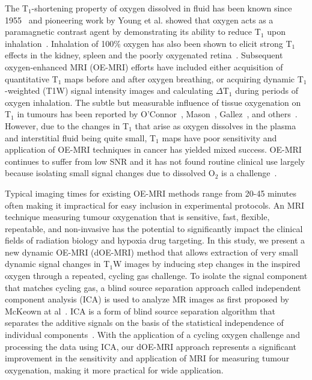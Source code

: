 The T$_1$-shortening property of oxygen dissolved in fluid has been known since 1955~\cite{Chiarotti:1955kf} and pioneering work by Young et al. showed that oxygen acts as a paramagnetic contrast agent by demonstrating its ability to reduce T$_1$ upon inhalation~\cite{Young:1981vf}. 
Inhalation of 100\% oxygen has also been shown to elicit strong T$_1$ effects in the kidney\cite{Jones:2002dh}, spleen\cite{Tadamura:1997vc} and the poorly oxygenated retina~\cite{Berkowitz:2001uz}. 
Subsequent oxygen-enhanced MRI (\acs{OE-MRI}) efforts have included either acquisition of quantitative T$_1$ maps before and after oxygen breathing, or acquiring dynamic T$_1$-weighted (T1W) signal intensity images and calculating $\Delta$T$_1$ during periods of oxygen inhalation.
The subtle but measurable influence of tissue oxygenation on T$_1$ in tumours has been reported by O'Connor~\cite{OConnor:2016ee,OConnor:2009ku,OConnor:2009bp,Little:2018iu}, Mason~\cite{Zhao:2015ez,White:2016fz,Hallac:2014cb}, Gallez~\cite{Jordan:2012do}, and others~\cite{Tadamura:1997vc,McGrath:2008kx,Kershaw:2010ha,Linnik:2013hf}. 
However, due to the changes in T$_1$ that arise as oxygen dissolves in the plasma and interstitial fluid being quite small, T$_1$ maps have poor sensitivity and application of OE-MRI techniques in cancer has yielded mixed success.
OE-MRI continues to suffer from low \acs{SNR} and it has not found routine clinical use largely because isolating small signal changes due to dissolved O$_2$ is a challenge~\cite{OConnor:2016ee, Zhao:2015ez}.

Typical imaging times for existing OE-MRI methods range from 20-45 minutes often making it impractical for easy inclusion in experimental protocols. 
An MRI technique measuring tumour oxygenation that is sensitive, fast, flexible, repeatable, and non-invasive has the potential to significantly impact the clinical fields of radiation biology and hypoxia drug targeting.
In this study, we present a new dynamic OE-MRI (dOE-MRI) method that allows extraction of very small dynamic signal changes in T$_1$W images by inducing step changes in the inspired oxygen through a repeated, cycling gas challenge.
To isolate the signal component that matches cycling gas, a blind source separation approach called independent component analysis (\acs{ICA}) is used to analyze MR images as first proposed by McKeown at al~\cite{McKeown:1998wo}.
\acs{ICA} is a form of blind source separation algorithm that separates the additive signals on the basis of the statistical independence of individual components~\cite{Hyvarinen:2000vk}.
With the application of a cycling oxygen challenge and processing the data using \acs{ICA}, our \acs{dOE-MRI} approach represents a significant improvement in the sensitivity and application of MRI for measuring tumour oxygenation, making it more practical for wide application.


